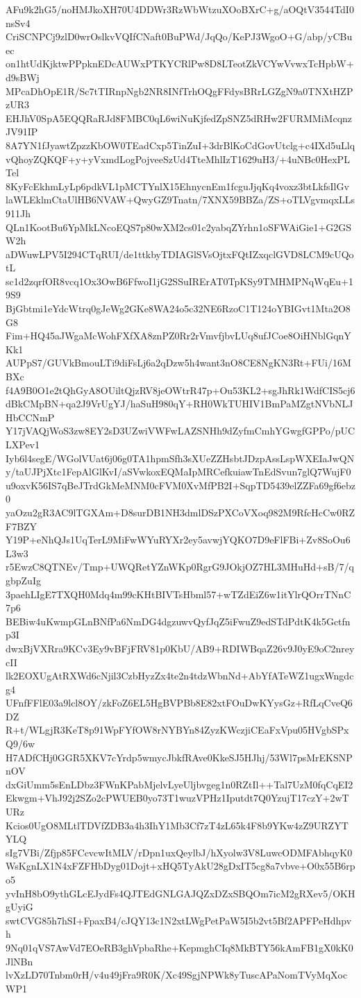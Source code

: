 AFu9k2hG5/noHMJkoXH70U4DDWr3RzWbWtzuXOoBXrC+g/aOQtV3544TdI0nsSv4
CriSCNPCj9zlD0wrOslkvVQIfCNaft0BuPWd/JqQo/KePJ3WgoO+G/abp/yCBuec
on1htUdKjktwPPpknEDcAUWxPTKYCRlPw8D8LTeotZkVCYwVvwxTcHpbW+d9sBWj
MPcaDhOpE1R/Sc7tTIRnpNgb2NR8INfTrhOQgFFdysBRrLGZgN9a0TNXtHZPzUR3
EHJhV0SpA5EQQRaRJd8FMBC0qL6wiNuKjfedZpSNZ5dRHw2FURMMiMcqnzJV91IP
8A7YN1fJyawtZpzzKbOW0TEadCxp5TinZuI+3drBlKoCdGovUtclg+c4IXd5uLlq
vQhoyZQKQF+y+yVxmdLogPojveeSzUd4TteMhlIzT1629uH3/+4uNBc0HexPLTel
8KyFcEkhmLyLp6pdkVL1pMCTYnlX15EhnycnEm1fcguJjqKq4voxz3btLkfsIlGv
laWLEklmCtaUlHB6NVAW+QwyGZ9Tnatn/7XNX59BBZa/ZS+oTLVgvmqxLLs911Jh
QLn1KootBu6YpMkLNcoEQS7p80wXM2cs01c2yabqZYrhn1oSFWAiGie1+G2GSW2h
aDWuwLPV5I294CTqRUI/de1ttkbyTDIAGlSVsOjtxFQtIZxqclGVD8LCM9cUQotL
sc1d2zqrfOR8vcq1Ox3OwB6FfwoI1jG2SSuIRErAT0TpKSy9TMHMPNqWqEu+19S9
BjGbtmi1eYdcWtrq0gJeWg2GKe8WA24o5c32NE6RzoC1T124oYBIGvt1Mta2O8G8
Fim+HQ45aJWgaMcWohFXfXA8znPZ0Rr2rVmvfjbvLUq8ufJCoe8OiHNblGqnYKk1
AUPpS7/GUVkBmouLTi9diFsLj6a2qDzw5h4want3nO8CE8NgKN3Rt+FUi/16MBXc
f4A9B0O1e2tQhGyA8OUiltQjzRV8jeOWtrR47p+Ou53KL2+sgJhRk1WdfCIS5cj6
dBkCMpBN+qa2J9VrUgYJ/haSuH980qY+RH0WkTUHIV1BmPaMZgtNVbNLJHbCCNmP
Y17jVAQjWoS3zw8EY2sD3UZwiVWFwLAZSNHh9dZyfmCmhYGwgfGPPo/pUCLXPev1
Iyb6l4segE/WGolVUat6j06g0TA1hpmSfh3sXUeZZHsbtJDzpAssLspWXEIaJwQN
y/taUJPjXtc1FepAlGlKvI/aSVwkoxEQMaIpMRCefkuiawTnEdSvun7glQ7WujF0
u9oxvK56IS7qBeJTrdGkMeMNM0cFVM0XvMfPB2I+SqpTD5439elZZFa69gf6ebz0
yaOzu2gR3AC9lTGXAm+D8surDB1NH3dmlDSzPXCoVXoq982M9RfcHcCw0RZF7BZY
Y19P+eNhQJs1UqTerL9MiFwWYuRYXr2ey5avwjYQKO7D9eFlFBi+Zv8SoOu6L3w3
r5EwzC8QTNEv/Tmp+UWQRetYZnWKp0RgrG9JOkjOZ7HL3MHuHd+sB/7/qgbpZuIg
3paehLIgE7TXQH0Mdq4m99cKHtBIVTsHbml57+wTZdEiZ6w1itYlrQOrrTNnC7p6
BEBiw4uKwmpGLnBNfPa6NmDG4dgzuwvQyfJqZ5iFwuZ9edSTdPdtK4k5Gctfnp3I
dwxBjVXRra9KCv3Ey9vBFjFRV81p0KbU/AB9+RDIWBqaZ26v9J0yE9oC2nreycII
lk2EOXUgAtRXWd6cNjil3CzbHyzZx4te2n4tdzWbnNd+AbYfATeWZ1ugxWngdcg4
UFnfFFlE03a9lcl8OY/zkFoZ6EL5HgBVPBb8E82xtFOuDwKYysGz+RfLqCveQ6DZ
R+t/WLgjR3KeT8p91WpFYfOW8rNYBYn84ZyzKWczjiCEaFxVpu05HVgbSPxQ9/6w
H7ADfCHj0GGR5XKV7cYrdp5wmycJbkfRAve0KkeSJ5HJhj/53Wl7psMrEKSNPnOV
dxGiUmm5sEnLDbz3FWnKPabMjelvLyeUljbvgeg1n0RZtIl++Tal7UzM0fqCqEI2
Ekwgm+VhJ92j2SZo2cPWUEB0yo73T1wuzVPHz1Iputdt7Q0YzujT17czY+2wTURz
Kcios0UgO8MLtlTDVfZDB3a4h3IhY1Mb3Cf7zT4zL65k4F8b9YKw4zZ9URZYTYLQ
sIg7VBi/Zfjp85FCcvcwItMLV/rDpn1uxQeylbJ/hXyolw3V8LuwcODMFAbhqyK0
WsKgnLX1N4xFZFHbDyg01Dojt+xHQ5TyAkU28gDxIT5cg8a7vbve+O0x55B6rpo5
yvInH8bO9ythGLcEJydFs4QJTEdGNLGAJQZxDZxSBQOm7icM2gRXev5/OKHgUyiG
swtCVG85h7hSI+FpaxB4/cJQY13c1N2xtLWgPetPaW5I5b2vt5Bf2APFPeHdhpvh
9Nq01qVS7AwVd7EOeRB3ghVpbaRhe+KepmghCIq8MkBTY56kAmFB1gX0kK0JlNBn
lvXzLD70Tnbm0rH/v4u49jFra9R0K/Xc49SgjNPWk8yTuscAPaNomTVyMqXocWP1
